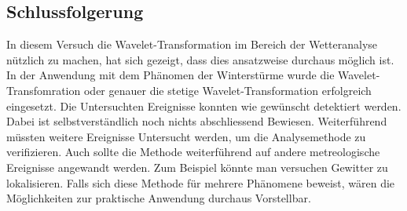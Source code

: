 \begin{refsection}
\section{Schlussfolgerung}

In diesem Versuch die Wavelet-Transformation im Bereich der Wetteranalyse nützlich zu machen, hat sich gezeigt, dass dies ansatzweise durchaus möglich ist.
In der Anwendung mit dem Phänomen der Winterstürme wurde die Wavelet-Transfomration oder genauer die stetige Wavelet-Transformation erfolgreich eingesetzt.
Die Untersuchten Ereignisse konnten wie gewünscht detektiert werden.
Dabei ist selbstverständlich noch nichts abschliessend Bewiesen.
Weiterführend müssten weitere Ereignisse Untersucht werden, um die Analysemethode zu verifizieren.
Auch sollte die Methode weiterführend auf andere metreologische Ereignisse angewandt werden.
Zum Beispiel könnte man versuchen Gewitter zu lokalisieren.
Falls sich diese Methode für mehrere Phänomene beweist, wären die Möglichkeiten zur praktische Anwendung durchaus Vorstellbar. 
 

\printbibliography[heading=subbibliography]
\end{refsection}
